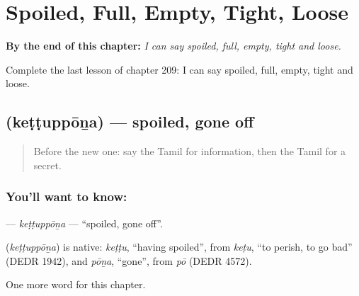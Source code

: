 
\chapter{Spoiled, Full, Empty, Tight, Loose}
\label{ch:ta-spoiled-full-empty-tight-loose}

\begin{chapteropening}
\textbf{By the end of this chapter:} \emph{I can say spoiled, full, empty, tight and loose.}

Complete the last lesson of chapter 209: I can say spoiled, full, empty, tight and loose.
\end{chapteropening}

\section[\texorpdfstring{\ta{கெட்டுப்போன} (keṭṭuppōṉa)}{கெட்டுப்போன (keṭṭuppōṉa)}]{ (keṭṭuppōṉa) — spoiled, gone off}

\label{lesson:TA-C209-kettuppona}



\begin{quote}
Before the new one: say the Tamil for information, then the Tamil for a secret.
\end{quote}

\subsection*{You'll want to know: }
\textbf{} — \emph{keṭṭuppōṉa} — \textquotedblleft{}spoiled, gone off\textquotedblright{}.

\begin{cousinweb}
\textbf{} (\emph{keṭṭuppōṉa}) is native: \emph{keṭṭu}, \textquotedblleft{}having spoiled\textquotedblright{}, from \emph{keṭu}, \textquotedblleft{}to perish, to go bad\textquotedblright{} (DEDR 1942), and \emph{pōṉa}, \textquotedblleft{}gone\textquotedblright{}, from \emph{pō} (DEDR 4572).
\end{cousinweb}

\begin{grammarlens}[title={What you've built}]
One more word for this chapter.
\end{grammarlens}

